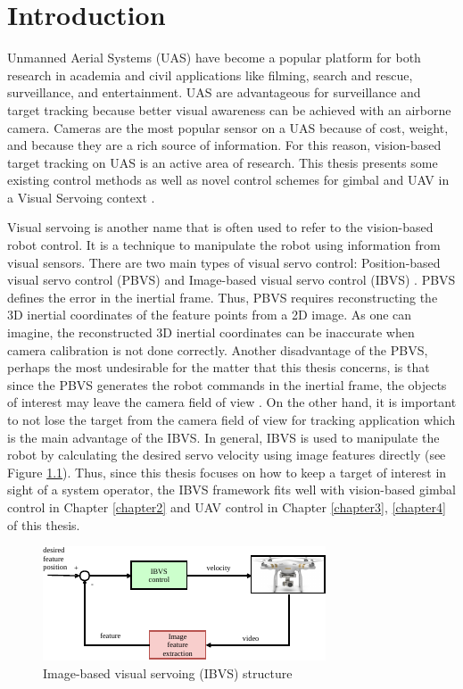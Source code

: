 \chapter{Introduction}

Unmanned Aerial Systems (UAS) have become a popular platform for both research in academia and civil applications like filming, search and rescue, surveillance, and entertainment. UAS are advantageous for surveillance and target tracking because better visual awareness can be achieved with an airborne camera. Cameras are the most popular sensor on a UAS because of cost, weight, and because they are a rich source of information. For this reason, vision-based target tracking on UAS is an active area of research. This thesis presents some existing control methods as well as novel control schemes for gimbal and UAV in a Visual Servoing context \cite{Hutchinson1996}. 

Visual servoing is another name that is often used to refer to the vision-based robot control. It is a technique to manipulate the robot using information from visual sensors. There are two main types of visual servo control: Position-based visual servo control (PBVS) and Image-based visual servo control (IBVS) \cite{Chaumette2006}. PBVS defines the error in the inertial frame. Thus, PBVS requires reconstructing the 3D inertial coordinates of the feature points from a 2D image. As one can imagine, the reconstructed 3D inertial coordinates can be inaccurate when camera calibration is not done correctly. Another disadvantage of the PBVS, perhaps the most undesirable for the matter that this thesis concerns, is that since the PBVS generates the robot commands in the inertial frame, the objects of interest may leave the camera field of view \cite{Hu2009}. On the other hand, it is important to not lose the target from the camera field of view for tracking application which is the main advantage of the IBVS. In general, IBVS is used to manipulate the robot by calculating the desired servo velocity using image features directly (see Figure \ref{ibvs}). Thus, since this thesis focuses on how to keep a target of interest in sight of a system operator, the IBVS framework fits well with vision-based gimbal control in Chapter \ref{chapter2} and UAV control in Chapter \ref{chapter3}, \ref{chapter4} of this thesis. 

\begin{figure}[htbp]
	\centering
	\includegraphics[width = 0.5\textheight]{images/ibvs}
	\caption{Image-based visual servoing (IBVS) structure}
	\label{ibvs}
\end{figure}

